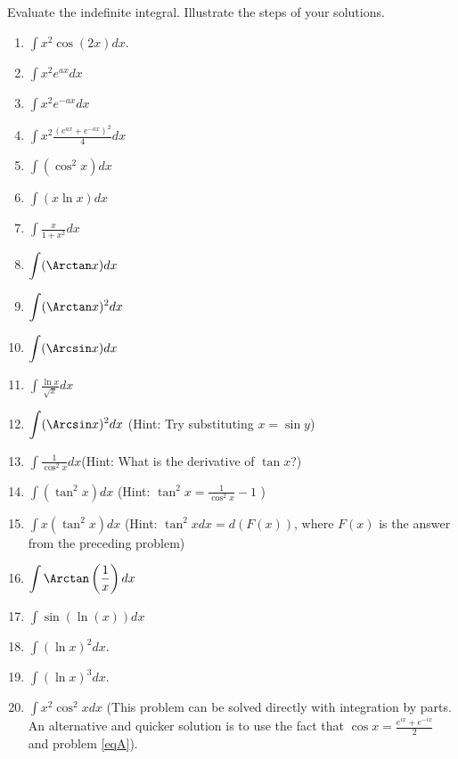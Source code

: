 Evaluate the indefinite integral. Illustrate the steps of your solutions.
\begin{multicols}{2}
\begin{enumerate}
\item $\displaystyle\int x^2\cos (2x) dx$.
\item 
$\displaystyle\int x^2e^{ax} dx$
\item 
$\displaystyle\int x^2e^{-ax}dx$
\item \label{eqA}
$\displaystyle\int x^2\frac{(e^{ax}+e^{-ax})^2}4dx$ 
\item 
$\displaystyle\int (\cos^2x) dx$ 
\item 
$\displaystyle \int (x\ln x )dx $
\item $\displaystyle\int \frac{x}{1+x^2} dx$ 
\item 
$\displaystyle \int (\Arctan x) dx$
\item 
$\displaystyle \int (\Arctan x)^2 dx$
\item 
$\displaystyle \int (\Arcsin x) dx
$
\item $\displaystyle\int \frac{\ln x}{\sqrt{x}}dx $
\item $\displaystyle\int (\Arcsin x)^2 dx $ \quad \quad (Hint: Try substituting $x=\sin y$)
\item $\displaystyle\int \frac{1}{\cos^2 x}dx$\quad \quad (Hint: What is the derivative of $\tan x$?)
\item $\displaystyle\int (\tan^2 x) dx $ \quad \quad (Hint: $\tan^2 x = \frac{1}{\cos^2x }-1$ )
\item $\displaystyle\int x(\tan^2 x) dx $ \quad \quad (Hint: $\tan^2 x dx= d(F(x))$, where $F(x)$ is the answer from the preceding problem)
\item 
$\displaystyle
\int\Arctan \left(\frac{1}x\right)dx
$
\item $\displaystyle\int \sin (\ln (x)) dx $
\item $\displaystyle\int (\ln x)^2 dx$.
\item $\displaystyle\int (\ln x)^3 dx$.
\item $\displaystyle\int x^2\cos^2x dx$ (This problem can be solved directly with integration by parts. An alternative and quicker solution is to use the fact that $\cos x= \frac{e^{ix}+e^{-ix}}{2}$ and problem \ref{eqA}).
\end{enumerate}
\end{multicols}